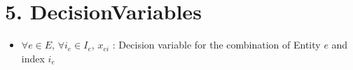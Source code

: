 \documentclass{article}
\begin{document}
\section{5. DecisionVariables}
\begin{itemize}[leftmargin=*]
    \item $\forall e \in E$, $\forall i_e \in I_e$, $x_{ei}$ : Decision variable for the combination of Entity $e$ and index $i_e$
\end{itemize}
\end{document}
